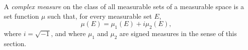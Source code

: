 A \textit{complex measure} on the class of all measurable sets of a measurable space is a set function $\mu$ such that, for every measurable set $E$,
$$\mu(E) = \mu_1(E) + i\mu_2(E),$$
where $i = \sqrt{-1}$, and where $\mu_1$ and $\mu_2$ are signed measures in the sense of this section.
